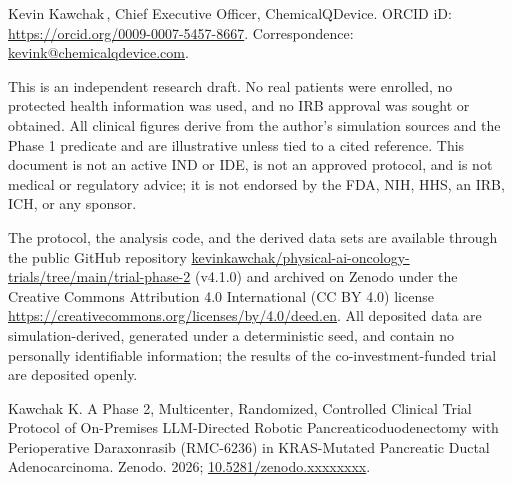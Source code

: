 Kevin Kawchak\,, Chief Executive Officer,
ChemicalQDevice. ORCID iD: \href{https://orcid.org/0009-0007-5457-8667}{https://orcid.org/0009-0007-5457-8667}.
Correspondence: \href{mailto:kevink@chemicalqdevice.com}{kevink@chemicalqdevice.com}.

This is an independent research draft. No real patients were enrolled, no protected
health information was used, and no IRB approval was sought or obtained. All clinical
figures derive from the author's simulation sources and the Phase 1 predicate and
are illustrative unless tied to a cited reference. This document is not an active IND
or IDE, is not an approved protocol, and is not medical or regulatory advice; it is
not endorsed by the FDA, NIH, HHS, an IRB, ICH, or any sponsor.

The protocol, the analysis code, and the derived data sets are available through the
public GitHub repository \href{https://github.com/kevinkawchak/physical-ai-oncology-trials/tree/main/trial-phase-2}{kevinkawchak/physical-ai-oncology-trials/tree/main/trial-phase-2} (v4.1.0) and archived on Zenodo under the Creative Commons
Attribution 4.0 International (CC BY 4.0) license \href{https://creativecommons.org/licenses/by/4.0/deed.en}{https://creativecommons.org/licenses/by/4.0/deed.en}. All deposited data are simulation-derived,
generated under a deterministic seed, and contain no personally identifiable
information; the results of the co-investment-funded trial are deposited openly.

Kawchak K. A Phase 2, Multicenter, Randomized, Controlled Clinical Trial Protocol of
On-Premises LLM-Directed Robotic Pancreaticoduodenectomy with Perioperative
Daraxonrasib (RMC-6236) in KRAS-Mutated Pancreatic Ductal Adenocarcinoma. Zenodo.
2026; \href{https://doi.org/10.5281/zenodo.xxxxxxxx}{10.5281/zenodo.xxxxxxxx}.

\begingroup\raggedright\nocite{*}\endgroup

